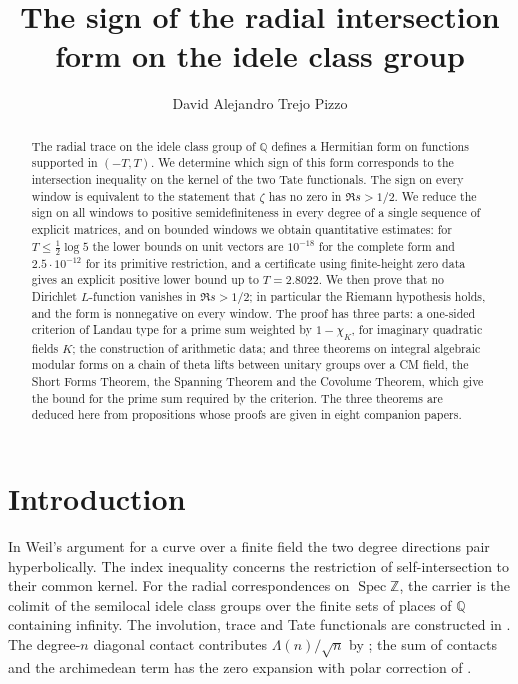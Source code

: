 \documentclass[10pt]{amsart}
\theoremstyle{definition}
\theoremstyle{remark}
\newcommand{\anThmA}{\ref{thm:srcA}}\newcommand{\anThmB}{\ref{thm:srcB}}\newcommand{\anThmC}{\ref{thm:srcC}}
\begin{document}
\addtolength{\abovedisplayskip}{-3.4pt}
\addtolength{\belowdisplayskip}{-3.4pt}
\addtolength{\belowdisplayshortskip}{-2pt}
\title[The sign of the radial intersection form]{The sign of the radial intersection form on the idele class group}
\author{David Alejandro Trejo Pizzo}
\date{}
\begin{abstract}
The radial trace on the idele class group of $\mathbb Q$ defines a Hermitian
form on functions supported in $(-T,T)$. We determine which sign of this form
corresponds to the intersection inequality on the kernel of the two Tate
functionals. The sign on every window is equivalent to the statement that
$\zeta$ has no zero in $\Re s>1/2$. We reduce the sign on all windows to
positive semidefiniteness in every degree of a single sequence of explicit
matrices, and on bounded windows we obtain quantitative estimates: for
$T\le\tfrac12\log5$ the lower bounds on unit vectors are $10^{-18}$ for the
complete form and $2.5\cdot10^{-12}$ for its primitive restriction, and a
certificate using finite-height zero data gives an explicit positive lower
bound up to $T=2.8022$. We then prove that no Dirichlet $L$-function
vanishes in $\Re s>1/2$; in particular the Riemann hypothesis holds, and the
form is nonnegative on every window. The proof has three parts: a one-sided
criterion of Landau type for a prime sum weighted by $1-\chi_K$, for
imaginary quadratic fields $K$; the construction of arithmetic data; and
three theorems on integral algebraic modular forms on a chain of theta lifts
between unitary groups over a CM field, the Short Forms Theorem, the Spanning
Theorem and the Covolume Theorem, which give the bound for the prime sum
required by the criterion. The three theorems are deduced here from
propositions whose proofs are given in eight companion papers.
\end{abstract}
\maketitle
\setcounter{tocdepth}{1}\tableofcontents
\providecommand{\anThmA}{\ref{thm:A}}
\providecommand{\anThmB}{\ref{thm:B}}
\providecommand{\anThmC}{\ref{thm:C}}
\section{Introduction}\label{sec:intro}
In Weil's argument for a curve over a finite field the two degree
directions pair hyperbolically. The index inequality concerns the
restriction of self-intersection to their common kernel. For the
radial correspondences on $\operatorname{Spec}\mathbb Z$, the
carrier is the colimit of the semilocal idele class groups over the
finite sets of places of $\mathbb Q$ containing infinity. The
involution, trace and Tate functionals are constructed in \cite{P43}.
The degree-$n$ diagonal contact contributes $\Lambda(n)/\sqrt n$
by \cite{P44}; the sum of contacts and the archimedean term has
the zero expansion with polar correction of \cite{Paper45}.
\end{document}

